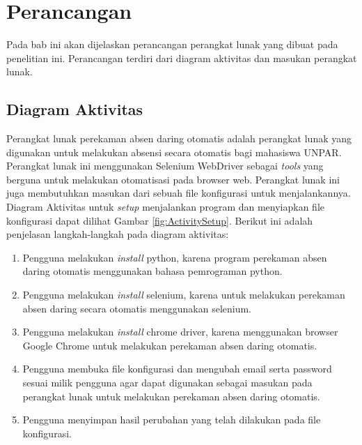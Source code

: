 \chapter{Perancangan}
\label{chap:perancangan}
Pada bab ini akan dijelaskan perancangan perangkat lunak yang dibuat pada penelitian ini. Perancangan terdiri dari diagram aktivitas dan masukan perangkat lunak. 

\section{Diagram Aktivitas}
\label{sec:diagramAktivitas}
Perangkat lunak perekaman absen daring otomatis adalah perangkat lunak yang digunakan untuk melakukan absensi secara otomatis bagi mahasiswa UNPAR. Perangkat lunak ini menggunakan Selenium WebDriver sebagai \textit{tools} yang berguna untuk melakukan otomatisasi pada browser web. Perangkat lunak ini juga membutuhkan masukan dari sebuah file konfigurasi untuk menjalankannya.
Diagram Aktivitas untuk \textit{setup} menjalankan program dan menyiapkan file konfigurasi dapat dilihat Gambar \ref{fig:ActivitySetup}. Berikut ini adalah penjelasan langkah-langkah pada diagram aktivitas:
\begin{enumerate}
	\item Pengguna melakukan \textit{install} python, karena program perekaman absen daring otomatis menggunakan bahasa pemrograman python.
	\item Pengguna melakukan \textit{install} selenium, karena untuk melakukan perekaman absen daring secara otomatis menggunakan selenium.
	\item Pengguna melakukan \textit{install} chrome driver, karena menggunakan browser Google Chrome untuk melakukan perekaman absen daring otomatis.
	\item Pengguna membuka file konfigurasi dan mengubah email serta password sesuai milik pengguna agar dapat digunakan sebagai masukan pada perangkat lunak untuk melakukan perekaman absen daring otomatis.
	\item Pengguna menyimpan hasil perubahan yang telah dilakukan pada file konfigurasi.
\end{enumerate}
